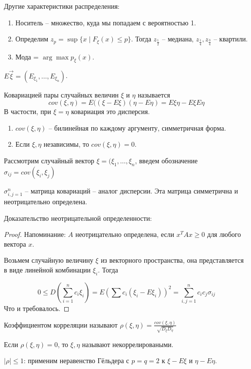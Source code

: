 Другие характеристики распределения:
\begin{enumerate}
\item Носитель -- множество, куда мы попадаем с вероятностью 1.
\item Определим $z_p = \sup \{x \mid F_\xi (x) \leq p\}$. Тогда $z_\frac12$ -- медиана, $z_\frac14, z_\frac34$ -- квартили.
\item Мода = $\arg\max p_\xi(x)$.
\end{enumerate}


\begin{Def}
    $E{\vec{\xi}} = (E_{\xi_1}, \dots, E_{\xi_n})$.
\end{Def}
\begin{Def}
    Ковариацией пары случайных величин $\xi$ и $\eta$ называется $$cov(\xi, \eta) = E((\xi - E\xi)(\eta - E\eta) = E\xi\eta - E\xi E\eta$$ 
    В частости, при $\xi = \eta$ ковариация это дисперсия.
\end{Def}

\begin{theorem}
\begin{enumerate}
    \item $cov(\xi, \eta)$ -- билинейная по каждому аргументу, симметричная форма.
    \item Если $\xi, \eta$ независимы, то $cov(\xi, \eta) = 0$.
\end{enumerate}
\end{theorem}

\begin{Def}
    Рассмотрим случайный вектор $\xi = (\xi_1, \dots, \xi_n$, введем обозначение $\sigma_{ij} = cov(\xi_i, \xi_j)$

    $\sigma_{i,j=1}^n$ -- матрица ковариаций -- аналог дисперсии. Эта матрица симметрична и неотрицательно определена.
\end{Def}
Доказательство неотрицательной определенности:
\begin{proof}
Напоминание: $A$ неотрицательно определена, если $x^TAx \geq 0$ для любого вектора $x$. 

Возьмем случайную величину $\xi$ из векторного пространства, она представляется в виде линейной комбинации $\xi_i$. Тогда

$$0 \leq D(\sum\limits_{i = 1}^n c_i \xi_i) = E(\sum c_i (\xi_i - E \xi_i))^2 = \sum\limits_{i,j=1}^n c_i c_j \sigma_{ij}$$
Что и требовалось.
\end{proof}

\begin{Def}
    Коэффициентом корреляции называют $\rho(\xi, \eta) = \frac{cov(\xi, \eta)}{\sqrt{D_\xi D_\eta}}$
    
    Если $\rho(\xi, \eta) = 0$, то $\xi, \eta$ называют некоррелироваными.
\end{Def}
\begin{Rem}
    $|\rho| \leq 1$: применим неравенство Гёльдера с $p=q=2$ к $\xi - E\xi$ и $\eta - E\eta$.
\end{Rem}

